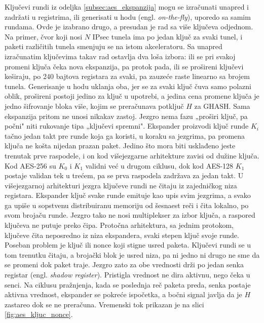 Ključevi rundi iz odeljka \ref{subsec:aes_ekspanzija} mogu se izračunati unapred i zadržati u registrima, ili generisati u hodu (engl. \textit{on-the-fly}), uporedo sa samim rundama. Ovde je izabrano drugo, a presudan je rad sa više ključeva odjednom. Na primer, čvor koji nosi $N$ IPsec tunela ima po jedan ključ za svaki tunel, i paketi različitih tunela smenjuju se na istom akceleratoru.
\smallbreak
Sa unapred izračunatim ključevima takav rad ostavlja dva loša izbora: ili se pri svakoj promeni ključa čeka nova ekspanzija, pa protok pada, ili se prošireni ključevi keširaju, po 240 bajtova registara za svaki, pa zauzeće raste linearno sa brojem tunela. Generisanje u hodu uklanja oba, jer se za svaki ključ čuva samo polazni oblik, prošireni postoji jedino za ključ u upotrebi, a jedina cena promene ključa je jedno šifrovanje bloka više, kojim se preračunava potključ $H$ za GHASH.
\smallbreak
Sama ekspanzija pritom ne unosi nikakav zastoj. Jezgro nema fazu „proširi ključ, pa počni" niti rukovanje tipa „ključevi spremni". Ekspander proizvodi ključ runde $K_i$ tačno jedan takt pre runde koja ga koristi, u koraku sa jezgrima, pa promena ključa ne košta nijedan prazan paket. Jedino što mora biti usklađeno jeste trenutak prve raspodele, i on kod višejezgarne arhitekture zavisi od dužine ključa. Kod AES-256 su $K_0$ i $K_1$ validni već u drugom ciklusu, dok kod AES-128 $K_1$ postaje validan tek u trećem, pa se prva raspodela zadržava za jedan takt.
\smallbreak
U višejezgarnoj arhitekturi jezgra ključeve rundi ne čitaju iz zajedničkog niza registara. Ekspander ključ svake runde emituje kao upis svim jezgrima, a svako ga upiše u sopstvenu distribuiranu memoriju od šesnaest reči i čita lokalno, po svom brojaču runde. Jezgro tako ne nosi multiplekser za izbor ključa, a raspored ključeva ne putuje preko čipa. Protočna arhitektura, sa jednim protokom, ključeve čita neposredno iz niza ekspandera, svaki stepen ključ svoje runde.
\smallbreak
Poseban problem je ključ ili nonce koji stigne usred paketa. Ključevi rundi se u tom trenutku čitaju, a brojački blok je usred niza, pa ni jedno ni drugo ne sme da se promeni dok paket traje. Jezgro zato za obe vrednosti drži po jedan senka registar (engl. \textit{shadow register}). Pristigla vrednost ne dira aktivnu, nego čeka u senci. Na ciklusu pražnjenja, kada se poslednja reč paketa preda, senka postaje aktivna vrednost, ekspander se pokreće ispočetka, a bočni signal javlja da je $H$ zastareo dok se ne preračuna. Vremenski tok prikazan je na slici \ref{fig:aes_kljuc_nonce}.

